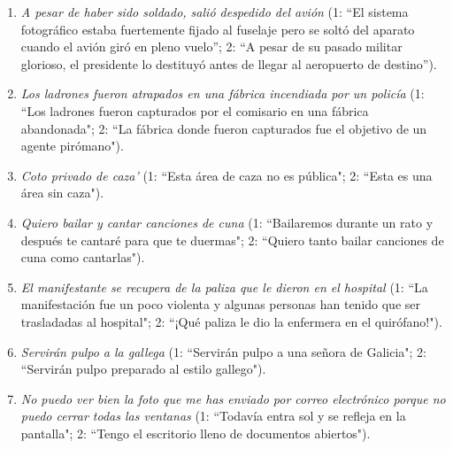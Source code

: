 \begin{enumerate}
\begin{enumerate}
\item \emph{A pesar de haber sido soldado, salió despedido del avión} (1: ``El sistema fotográfico estaba fuertemente fijado al fuselaje pero se soltó del aparato cuando el avión giró en pleno vuelo''; 2: ``A pesar de su pasado militar glorioso, el presidente lo destituyó antes de llegar al aeropuerto de destino''). \item \emph{Los ladrones fueron atrapados en una fábrica incendiada por un policía} (1: ``Los ladrones fueron capturados por el comisario en una fábrica abandonada"; 2: ``La fábrica donde fueron capturados fue el objetivo de un agente pirómano"). \item \emph{Coto privado de caza'} (1: ``Esta área de caza no es pública"; 2: ``Esta es una área sin caza"). \item \emph{Quiero bailar y cantar canciones de cuna} (1: ``Bailaremos durante un rato y después te cantaré para que te duermas"; 2: ``Quiero tanto bailar canciones de cuna como cantarlas"). \item \emph{El manifestante se recupera de la paliza que le dieron en el hospital} (1: ``La manifestación fue un poco violenta y algunas personas han tenido que ser trasladadas al hospital"; 2: ``¡Qué paliza le dio la enfermera en el quirófano!"). \item \emph{Servirán pulpo a la gallega} (1: ``Servirán pulpo a una señora de Galicia"; 2: ``Servirán pulpo preparado al estilo gallego"). \item \emph{No puedo ver bien la foto que me has enviado por correo electrónico porque no puedo cerrar todas las ventanas} (1: ``Todavía entra sol y se refleja en la pantalla"; 2: ``Tengo el escritorio lleno de documentos abiertos"). 


\end{enumerate}
\end{enumerate}
